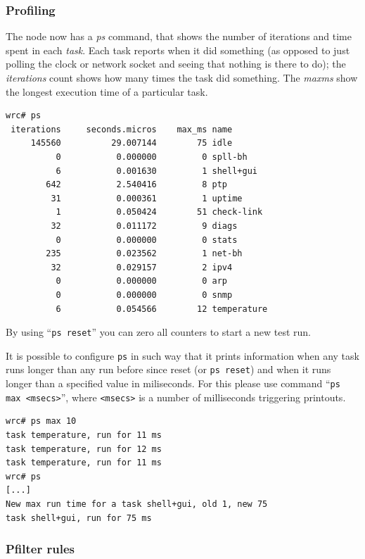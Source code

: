 \documentclass[a4paper, 12pt]{article}
\renewcommand{\_}{\underscore\allowbreak}
\begin{document}
\subsubsection{Profiling}
\label{Profiling}

The node now has a \textit{ps} command, that shows the number of iterations
and time spent in each \textit{task}. Each task reports when it did
something (as opposed to just polling the clock or network socket and
seeing that nothing is there to do); the \textit{iterations} count shows how many
times the task did something. The \textit{max\_ms} show the longest execution
time of a particular task.

\begin{lstlisting}
wrc# ps
 iterations     seconds.micros    max_ms name
     145560          29.007144        75 idle
          0           0.000000         0 spll-bh
          6           0.001630         1 shell+gui
        642           2.540416         8 ptp
         31           0.000361         1 uptime
          1           0.050424        51 check-link
         32           0.011172         9 diags
          0           0.000000         0 stats
        235           0.023562         1 net-bh
         32           0.029157         2 ipv4
          0           0.000000         0 arp
          0           0.000000         0 snmp
          6           0.054566        12 temperature
\end{lstlisting}

By using ``\texttt{ps reset}'' you can zero all counters to start a new
test run.

It is possible to configure \texttt{ps} in such way that it prints information
when any task runs longer than any run before since reset
(or \texttt{ps reset}) and when it runs longer than a specified value
in miliseconds.
For this please use command ``\texttt{ps max <msecs>}'', where
\texttt{<msecs>} is a number of milliseconds triggering printouts.
\begin{lstlisting}
wrc# ps max 10
task temperature, run for 11 ms
task temperature, run for 12 ms
task temperature, run for 11 ms
wrc# ps
[...]
New max run time for a task shell+gui, old 1, new 75
task shell+gui, run for 75 ms
\end{lstlisting}

\subsubsection{Pfilter rules}
\label{Pfilter rules}
\end{document}
